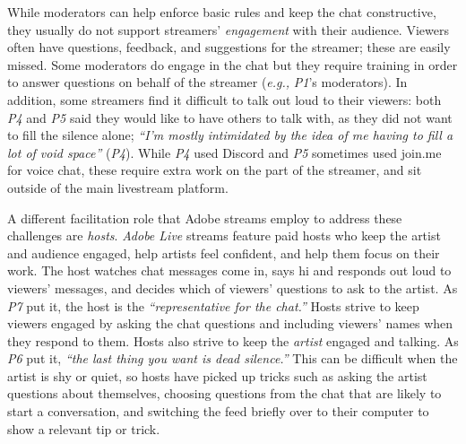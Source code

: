 While moderators can help enforce basic rules and keep the chat constructive, they usually do not support streamers' \textit{engagement} with their audience. Viewers often have questions, feedback, and suggestions for the streamer; these are easily missed. Some moderators do engage in the chat \cite{YvetteWohn2019} but they require training in order to answer questions on behalf of the streamer (\textit{e.g.,} \textit{P1}'s moderators). In addition, some streamers find it difficult to talk out loud to their viewers: both \textit{P4} and \textit{P5} said they would like to have others to talk with, as they did not want to fill the silence alone; \textit{``I'm mostly intimidated by the idea of me having to fill a lot of void space''} (\textit{P4}). While \textit{P4} used Discord and \textit{P5} sometimes used join.me for voice chat, these require extra work on the part of the streamer, and sit outside of the main livestream platform.

A different facilitation role that Adobe streams employ to address these challenges are \textit{hosts}. \textit{Adobe Live} streams feature paid hosts who keep the artist and audience engaged, help artists feel confident, and help them focus on their work. The host watches chat messages come in, says hi and responds out loud to viewers' messages, and decides which of viewers' questions to ask to the artist. As \textit{P7} put it, the host is the \textit{``representative for the chat.''} Hosts strive to keep viewers engaged by asking the chat questions and including viewers' names when they respond to them. Hosts also strive to keep the \textit{artist} engaged and talking. As \textit{P6} put it, \textit{``the last thing you want is dead silence.''} This can be difficult when the artist is shy or quiet, so hosts have picked up tricks such as asking the artist questions about themselves, choosing questions from the chat that are likely to start a conversation, and switching the feed briefly over to their computer to show a relevant tip or trick.



